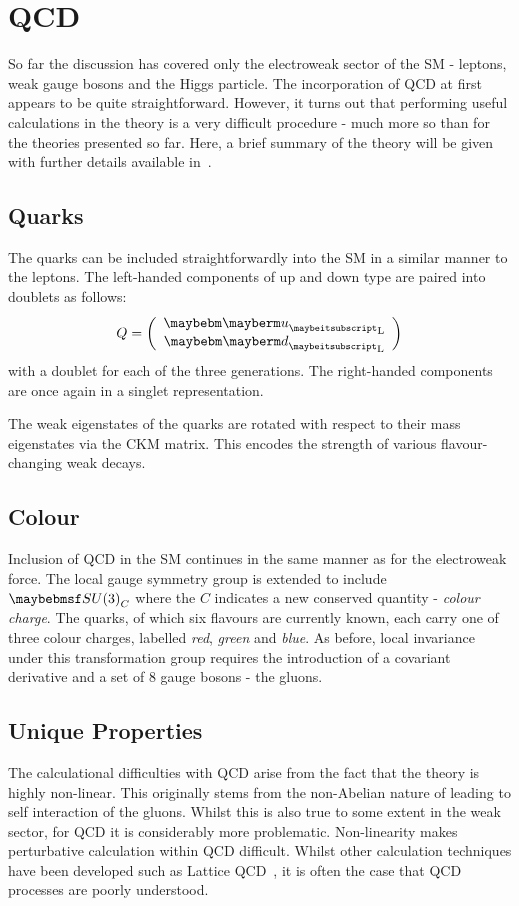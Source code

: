 \section{\acl{QCD}}
So far the discussion has covered only the electroweak sector of the \ac{SM} -
leptons, weak gauge bosons and the Higgs particle. The incorporation of
\acl{QCD} at first appears to be quite straightforward. However, it turns out
that performing useful calculations in the theory is a very difficult procedure
- much more so than for the theories presented so far. Here, a brief summary of
the theory will be given with further details available in~\cite{pink_book}.

\subsection{Quarks}
The quarks can be included straightforwardly into the \ac{SM} in a similar
manner to the leptons. The left-handed components of up and down type are paired
into doublets as follows:
\begin{equation}
Q=\left(\begin{array}{c}\Pup_{\textrm{L}} \\ \Pdown_{\textrm{L}}\end{array}\right)
\end{equation}
with a doublet for each of the three generations. The right-handed components
are once again in a singlet representation.

The weak eigenstates of the quarks are rotated with respect to their mass
eigenstates via the \acl{CKM} matrix. This encodes the strength of various
flavour-changing weak decays.

\subsection{Colour}
Inclusion of \ac{QCD} in the \ac{SM} continues in the same manner as for the
electroweak force. The local gauge symmetry group is extended to include
$\SUthree_{C}$ where the $C$ indicates a new conserved quantity - \emph{colour
  charge}. The quarks, of which six flavours are currently known, each carry one
of three colour charges, labelled \emph{red}, \emph{green} and \emph{blue}. As
before, local invariance under this transformation group requires the
introduction of a covariant derivative and a set of 8 gauge bosons - the gluons.

\subsection{Unique Properties}
The calculational difficulties with \ac{QCD} arise from the fact that the theory
is highly non-linear. This originally stems from the non-Abelian nature of
\SUthree leading to self interaction of the gluons. Whilst this is also true to
some extent in the weak sector, for \ac{QCD} it is considerably more
problematic. Non-linearity makes perturbative calculation within \ac{QCD}
difficult. Whilst other calculation techniques have been developed such as
Lattice \ac{QCD}~\cite{lattice_qcd}, it is often the case that \ac{QCD}
processes are poorly understood.

